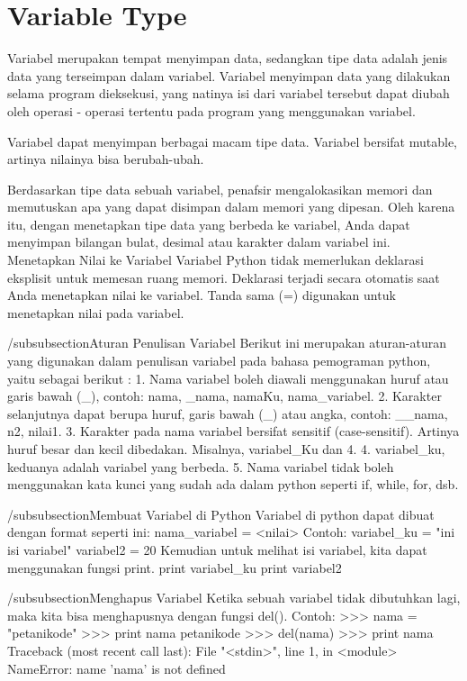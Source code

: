 \section{Variable Type}
Variabel merupakan tempat menyimpan data, sedangkan tipe data adalah jenis data yang terseimpan dalam variabel. Variabel menyimpan data yang dilakukan selama program dieksekusi, yang natinya isi dari variabel tersebut dapat diubah oleh operasi - operasi tertentu pada program yang menggunakan variabel.

Variabel dapat menyimpan berbagai macam tipe data. Variabel bersifat mutable, artinya nilainya bisa berubah-ubah.

Berdasarkan tipe data sebuah variabel, penafsir mengalokasikan memori dan memutuskan apa yang dapat disimpan dalam memori yang dipesan. Oleh karena itu, dengan menetapkan tipe data yang berbeda ke variabel, Anda dapat menyimpan bilangan bulat, desimal atau karakter dalam variabel ini.
Menetapkan Nilai ke Variabel
Variabel Python tidak memerlukan deklarasi eksplisit untuk memesan ruang memori. Deklarasi terjadi secara otomatis saat Anda menetapkan nilai ke variabel. Tanda sama (=) digunakan untuk menetapkan nilai pada variabel.

/subsubsection{Aturan Penulisan Variabel}
Berikut ini merupakan aturan-aturan yang digunakan dalam penulisan variabel pada bahasa pemograman python, yaitu sebagai berikut :
1. Nama variabel boleh diawali menggunakan huruf atau garis bawah (_), contoh: nama, _nama, namaKu, nama_variabel.
2. Karakter selanjutnya dapat berupa huruf, garis bawah (_) atau angka, contoh: __nama, n2, nilai1.
3. Karakter pada nama variabel bersifat sensitif (case-sensitif). Artinya huruf besar dan kecil dibedakan. Misalnya, variabel_Ku dan 4. 4. variabel_ku, keduanya adalah variabel yang berbeda.
5. Nama variabel tidak boleh menggunakan kata kunci yang sudah ada dalam python seperti if, while, for, dsb.

/subsubsection{Membuat Variabel di Python}
Variabel di python dapat dibuat dengan format seperti ini:
nama_variabel = <nilai>
Contoh:
variabel_ku = "ini isi variabel"
variabel2 = 20
Kemudian untuk melihat isi variabel, kita dapat menggunakan fungsi print.
print variabel_ku
print variabel2

/subsubsection{Menghapus Variabel}
Ketika sebuah variabel tidak dibutuhkan lagi, maka kita bisa menghapusnya dengan fungsi del().
Contoh:
>>> nama = "petanikode"
>>> print nama
petanikode
>>> del(nama)
>>> print nama
Traceback (most recent call last):
  File "<stdin>", line 1, in <module>
NameError: name 'nama' is not defined
